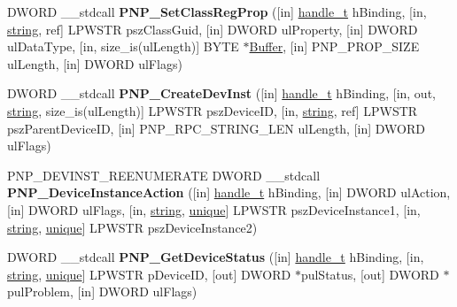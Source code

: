 \begin{DoxyCompactItemize}
\item 
\mbox{\label{interfacepnp_a3cafe1106fcf754732b0885a6af9a6b5}} 
D\+W\+O\+RD \+\_\+\+\_\+stdcall {\bfseries P\+N\+P\+\_\+\+Set\+Class\+Reg\+Prop} (\mbox{[}in\mbox{]} \hyperlink{interfacevoid}{handle\+\_\+t} h\+Binding, \mbox{[}in, \hyperlink{structstring}{string}, ref\mbox{]} L\+P\+W\+S\+TR psz\+Class\+Guid, \mbox{[}in\mbox{]} D\+W\+O\+RD ul\+Property, \mbox{[}in\mbox{]} D\+W\+O\+RD ul\+Data\+Type, \mbox{[}in, size\+\_\+is(ul\+Length)\mbox{]} B\+Y\+TE $\ast$\hyperlink{class_buffer}{Buffer}, \mbox{[}in\mbox{]} P\+N\+P\+\_\+\+P\+R\+O\+P\+\_\+\+S\+I\+ZE ul\+Length, \mbox{[}in\mbox{]} D\+W\+O\+RD ul\+Flags)
\item 
\mbox{\label{interfacepnp_ac0ccd991a04cd1f8a8d3d0f71c244c27}} 
D\+W\+O\+RD \+\_\+\+\_\+stdcall {\bfseries P\+N\+P\+\_\+\+Create\+Dev\+Inst} (\mbox{[}in\mbox{]} \hyperlink{interfacevoid}{handle\+\_\+t} h\+Binding, \mbox{[}in, out, \hyperlink{structstring}{string}, size\+\_\+is(ul\+Length)\mbox{]} L\+P\+W\+S\+TR psz\+Device\+ID, \mbox{[}in, \hyperlink{structstring}{string}, ref\mbox{]} L\+P\+W\+S\+TR psz\+Parent\+Device\+ID, \mbox{[}in\mbox{]} P\+N\+P\+\_\+\+R\+P\+C\+\_\+\+S\+T\+R\+I\+N\+G\+\_\+\+L\+EN ul\+Length, \mbox{[}in\mbox{]} D\+W\+O\+RD ul\+Flags)
\item 
\mbox{\label{interfacepnp_a91cd2677ec0a326297a03b8e951d2d6d}} 
P\+N\+P\+\_\+\+D\+E\+V\+I\+N\+S\+T\+\_\+\+R\+E\+E\+N\+U\+M\+E\+R\+A\+TE D\+W\+O\+RD \+\_\+\+\_\+stdcall {\bfseries P\+N\+P\+\_\+\+Device\+Instance\+Action} (\mbox{[}in\mbox{]} \hyperlink{interfacevoid}{handle\+\_\+t} h\+Binding, \mbox{[}in\mbox{]} D\+W\+O\+RD ul\+Action, \mbox{[}in\mbox{]} D\+W\+O\+RD ul\+Flags, \mbox{[}in, \hyperlink{structstring}{string}, \hyperlink{interfaceunique}{unique}\mbox{]} L\+P\+W\+S\+TR psz\+Device\+Instance1, \mbox{[}in, \hyperlink{structstring}{string}, \hyperlink{interfaceunique}{unique}\mbox{]} L\+P\+W\+S\+TR psz\+Device\+Instance2)
\item 
\mbox{\label{interfacepnp_a6a3b05dfbe15f4574a62e59ddcab385b}} 
D\+W\+O\+RD \+\_\+\+\_\+stdcall {\bfseries P\+N\+P\+\_\+\+Get\+Device\+Status} (\mbox{[}in\mbox{]} \hyperlink{interfacevoid}{handle\+\_\+t} h\+Binding, \mbox{[}in, \hyperlink{structstring}{string}, \hyperlink{interfaceunique}{unique}\mbox{]} L\+P\+W\+S\+TR p\+Device\+ID, \mbox{[}out\mbox{]} D\+W\+O\+RD $\ast$pul\+Status, \mbox{[}out\mbox{]} D\+W\+O\+RD $\ast$pul\+Problem, \mbox{[}in\mbox{]} D\+W\+O\+RD ul\+Flags)

\end{DoxyCompactItemize}
